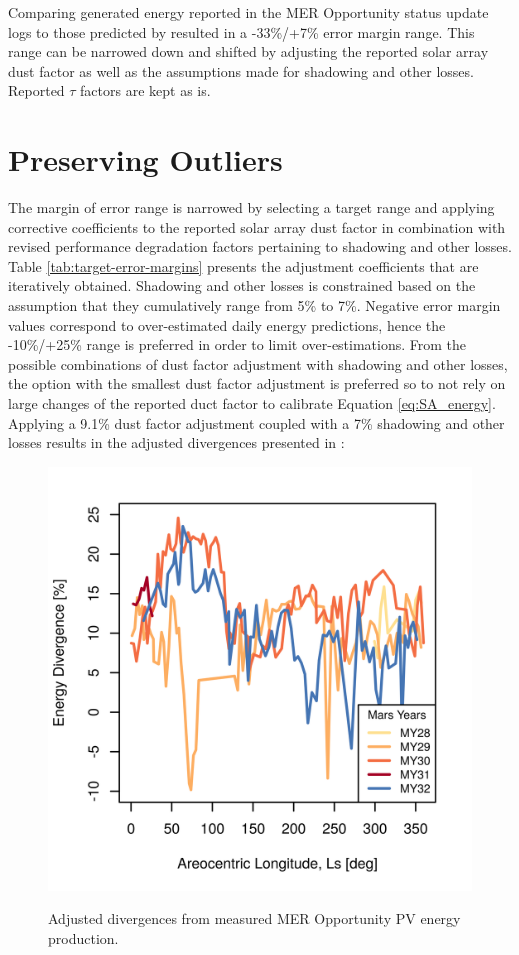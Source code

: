 Comparing generated energy reported in the \ac{MER} Opportunity status update logs to those predicted by  resulted in a -33\%/+7\% error margin range. This range can be narrowed down and shifted by adjusting the reported solar array dust factor as well as the assumptions made for shadowing and other losses. Reported $\tau$ factors are kept as is.

\section{Preserving Outliers}
\label{sec:Appendix:NarrowedEnergyPredictionErrorMarginRange:PreservingOutliers}

The margin of error range is narrowed by selecting a target range and applying corrective coefficients to the reported solar array dust factor in combination with revised performance degradation factors pertaining to shadowing and other losses. Table \ref{tab:target-error-margins} presents the adjustment coefficients that are iteratively obtained. Shadowing and other losses is constrained based on the assumption that they cumulatively range from 5\% to 7\%. Negative error margin values correspond to over-estimated daily energy predictions, hence the -10\%/+25\% range is preferred in order to limit over-estimations. From the possible combinations of dust factor adjustment with shadowing and other losses, the option with the smallest dust factor adjustment is preferred so to not rely on large changes of the reported duct factor to calibrate Equation \ref{eq:SA_energy}. Applying a 9.1\% dust factor adjustment coupled with a 7\% shadowing and other losses results in the adjusted divergences presented in :

\begin{figure}[h]
  \centering
  \hypersetup{linkcolor=captionTextColor}
  \includegraphics[width=0.5\linewidth]{sections/appendix/energy-error-margin/plots/energy-prediction-divergences-from-my28-to-my32-adjusted.png}\\
  \caption[Adjusted divergences from measured \ac{MER} Opportunity PV energy production]
          {Adjusted divergences from measured \ac{MER} Opportunity PV energy production.}
  \label{fig:plot:mer-energy-prediction-divergences-adjusted}
\end{figure}


